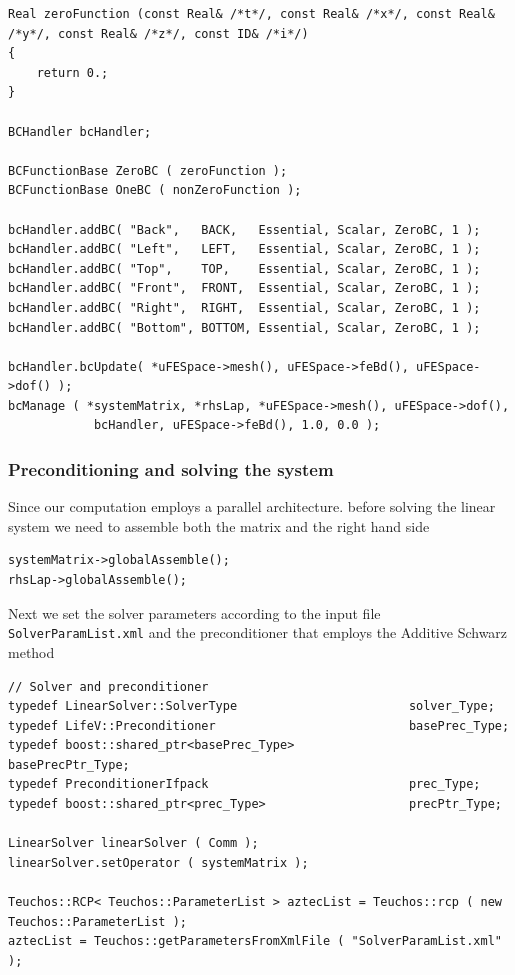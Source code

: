 \begin{itemize}
\begin{lstlisting}
Real zeroFunction (const Real& /*t*/, const Real& /*x*/, const Real& /*y*/, const Real& /*z*/, const ID& /*i*/)
{
    return 0.;
}

BCHandler bcHandler;

BCFunctionBase ZeroBC ( zeroFunction );
BCFunctionBase OneBC ( nonZeroFunction );

bcHandler.addBC( "Back",   BACK,   Essential, Scalar, ZeroBC, 1 );
bcHandler.addBC( "Left",   LEFT,   Essential, Scalar, ZeroBC, 1 );
bcHandler.addBC( "Top",    TOP,    Essential, Scalar, ZeroBC, 1 );
bcHandler.addBC( "Front",  FRONT,  Essential, Scalar, ZeroBC, 1 );
bcHandler.addBC( "Right",  RIGHT,  Essential, Scalar, ZeroBC, 1 );
bcHandler.addBC( "Bottom", BOTTOM, Essential, Scalar, ZeroBC, 1 );

bcHandler.bcUpdate( *uFESpace->mesh(), uFESpace->feBd(), uFESpace->dof() );
bcManage ( *systemMatrix, *rhsLap, *uFESpace->mesh(), uFESpace->dof(), 
            bcHandler, uFESpace->feBd(), 1.0, 0.0 );
\end{lstlisting}

\subsubsection*{Preconditioning and solving the system}
Since our computation employs a parallel architecture. before solving the linear system we need to assemble both the matrix and the right hand side
\begin{lstlisting}
systemMatrix->globalAssemble();
rhsLap->globalAssemble();
\end{lstlisting}
Next we set the solver parameters according to the input file \verb!SolverParamList.xml! and the preconditioner that employs the Additive Schwarz method
\begin{lstlisting}
// Solver and preconditioner
typedef LinearSolver::SolverType                        solver_Type;
typedef LifeV::Preconditioner                           basePrec_Type;
typedef boost::shared_ptr<basePrec_Type>                basePrecPtr_Type;
typedef PreconditionerIfpack                            prec_Type;
typedef boost::shared_ptr<prec_Type>                    precPtr_Type;

LinearSolver linearSolver ( Comm );
linearSolver.setOperator ( systemMatrix );

Teuchos::RCP< Teuchos::ParameterList > aztecList = Teuchos::rcp ( new Teuchos::ParameterList );
aztecList = Teuchos::getParametersFromXmlFile ( "SolverParamList.xml" );


\end{lstlisting}
\end{itemize}
